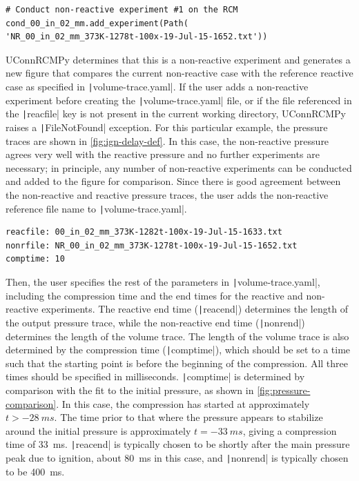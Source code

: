 \documentclass[12pt]{../ussci}
\begin{document}
\begin{verbatim}
# Conduct non-reactive experiment #1 on the RCM
cond_00_in_02_mm.add_experiment(Path(
'NR_00_in_02_mm_373K-1278t-100x-19-Jul-15-1652.txt'))
\end{verbatim}

UConnRCMPy determines that this is a non-reactive experiment and
generates a new figure that compares the current non-reactive case with
the reference reactive case as specified in \texttt|volume-trace.yaml|.
If the user adds a non-reactive experiment before creating the
\texttt|volume-trace.yaml| file, or if the file referenced in the
\texttt|reacfile| key is not present in the current working directory,
UConnRCMPy raises a \texttt|FileNotFound| exception. For this particular
example, the pressure traces are shown in \cref{fig:ign-delay-def}. In this case, the non-reactive
pressure agrees very well with the reactive pressure and no further
experiments are necessary; in principle, any number of non-reactive
experiments can be conducted and added to the figure for comparison.
Since there is good agreement between the non-reactive and reactive
pressure traces, the user adds the non-reactive reference file name to
\texttt|volume-trace.yaml|.

\begin{verbatim}
reacfile: 00_in_02_mm_373K-1282t-100x-19-Jul-15-1633.txt
nonrfile: NR_00_in_02_mm_373K-1278t-100x-19-Jul-15-1652.txt
comptime: 10
\end{verbatim}

Then, the user specifies the rest of the parameters in
\texttt|volume-trace.yaml|, including the compression time and the end
times for the reactive and non-reactive experiments. The reactive end
time (\texttt|reacend|) determines the length of the output pressure
trace, while the non-reactive end time (\texttt|nonrend|) determines the
length of the volume trace. The length of the volume trace is also
determined by the compression time (\texttt|comptime|), which should be
set to a time such that the starting point is before the beginning of
the compression. All three times should be specified in milliseconds.
\texttt|comptime| is determined by comparison with the fit to the
initial pressure, as shown in \cref{fig:pressure-comparison}.
In this case, the compression has started at approximately
\(t > \SI{-28}{ms}\). The time prior to that where the pressure
appears to stabilize around the initial pressure is approximately
\(t = \SI{-33}{ms}\), giving a compression time of \SI{33}{\ms}.
\texttt|reacend| is typically chosen to be shortly after the main
pressure peak due to ignition, about \SI{80}{\ms} in this case, and
\texttt|nonrend| is typically chosen to be \SI{400}{\ms}.
\end{document}
